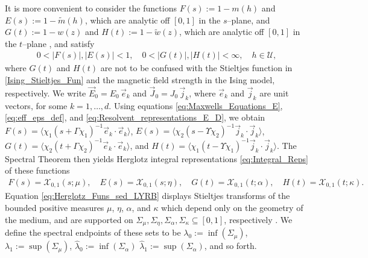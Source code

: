 \documentclass[english,12pt,jmp,graphicx]{revtex4-1}
\begin{document}
It is more convenient to consider the functions
$F(s):=1-m(h)$ and $E(s):=1-\tilde{m}(h)$, which are
analytic off $[0,1]$ in the $s$--plane, and $G(t):=1-w(z)$ and
$H(t):=1-\tilde{w}(z)$, which are analytic off $[0,1]$ in the
$t$--plane \cite{Bergman:PRC-377,Golden:CMP-473}, and satisfy
%
\begin{align}\label{eq:Stieltjes_Bounds}
  0<|F(s)|,|E(s)|<1, \quad 0<|G(t)|,|H(t)|<\infty,\quad h\in\mathcal{U},
\end{align}
%
where $G(t)$ and $H(t)$ are not to be confused with the Stieltjes
function in \eqref{Ising_Stieltjes_Fun} and the magnetic field
strength in the Ising model, respectively. We write $\vec{E}_0=E_0\,\vec{e}_k$ and
$\vec{J}_0=J_0\,\vec{j}_k$, where $\vec{e}_k$ and $\vec{j}_k$ are unit
vectors, for some $k=1,\ldots,d$. Using equations
\eqref{eq:Maxwells_Equations_E}, \eqref{eq:eff_eps_def}, and
\eqref{eq:Resolvent_representations_E_D}, we obtain  
$F(s)=\langle\chi_1(s+\Gamma\chi_1)^{-1}\vec{e}_k\cdot\vec{e}_k\rangle$,
$E(s)=\langle\chi_2(s-\Upsilon\chi_2)^{-1}\vec{j}_k\cdot\vec{j}_k\rangle$,
$G(t)=\langle\chi_2(t+\Gamma\chi_2)^{-1}\vec{e}_k\cdot\vec{e}_k\rangle$, and
$H(t)=\langle\chi_1(t-\Upsilon\chi_1)^{-1}\vec{j}_k\cdot\vec{j}_k\rangle$. The Spectral Theorem 
\cite{Reed-1980} then yields Herglotz integral representations
\eqref{eq:Integral_Reps} of these functions
\cite{Golden:CMP-473,Bergman:PRC-377}
%
\begin{align}\label{eq:Herglotz_Funs_sed_LYRB}
  F(s)=\mathcal{X}_{0,1}(s;\mu), \quad
  E(s)=\mathcal{X}_{0,1}(s;\eta), \quad
  G(t)=\mathcal{X}_{0,1}(t;\alpha), \quad
  H(t)=\mathcal{X}_{0,1}(t;\kappa).
\end{align}
%
Equation \eqref{eq:Herglotz_Funs_sed_LYRB} displays Stieltjes
transforms of the bounded positive measures $\mu$, $\eta$, $\alpha$, and
$\kappa$ which depend only on the geometry of the medium, and are supported
on $\Sigma_\mu,\Sigma_\eta,\Sigma_\alpha,\Sigma_\kappa\subseteq[0,1]$, respectively 
\cite{Golden:CMP-473,Bergman:AP-78}. We define the spectral endpoints
of these sets to be $\lambda_0:=\inf(\Sigma_\mu)$, $\lambda_1:=\sup(\Sigma_\mu)$,
$\hat{\lambda}_0:=\inf(\Sigma_\alpha)$ $\hat{\lambda}_1:=\sup(\Sigma_\alpha)$,
and so forth.
\end{document}
